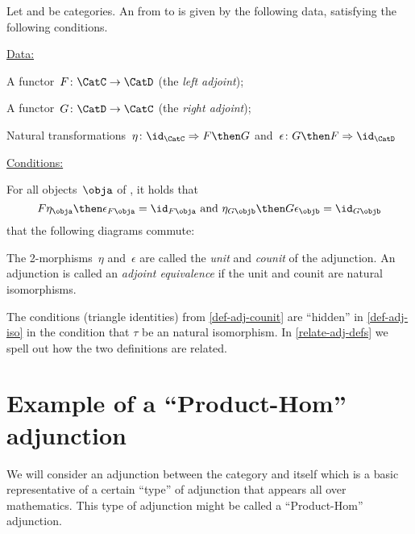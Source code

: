 \begin{ctdefinition}\label{def-adj-counit}
  \label{def:cat-adjunction}
 Let \CatC and \CatD be categories. An \emph{} from \CatC to \CatD is given by the following data, satisfying the following conditions.

  \underline{Data:}
  \begin{compactenum}
    \item A functor~$F\colon \CatC \to \CatD$ (the \emph{left adjoint});
    \item A functor~$G\colon \CatD \to \CatC$ (the \emph{right adjoint});
    \item Natural transformations~$\eta \colon \id_\CatC \Rightarrow F \then G$ and~$\epsilon \colon G \then F \Rightarrow \id_\CatD$
  \end{compactenum}

  \underline{Conditions:}
  \begin{compactenum}
    \item For all objects~$\obja$ of \CatC, it holds that
    \begin{equation*}
      F\eta_\obja \then \epsilon_{F\obja} = \id_{F\obja} \text{ and }  \eta_{G\objb} \then G\epsilon_\objb = \id_{G\objb}
    \end{equation*}
     that the following diagrams commute:

\begin{center}
\end{center}
  \end{compactenum}
  
  The 2-morphisms~$\eta$ and~$\epsilon$ are called the \emph{unit} and \emph{counit} of the adjunction.
  An adjunction is called an \emph{adjoint equivalence} if the unit and counit are natural isomorphisms.
\end{ctdefinition}

\begin{remark}
The conditions (triangle identities) from \cref{def-adj-counit} are ``hidden'' in \cref{def-adj-iso} in the condition that $\tau$ be an natural isomorphism. In \cref{relate-adj-defs} we spell out how the two definitions are related. 
\end{remark}

\section{Example of a ``Product-Hom'' adjunction}
We will consider an adjunction between the category \Set and itself which is a basic representative of a certain ``type'' of adjunction that appears all over mathematics. This type of adjunction might be called a ``Product-Hom'' adjunction. 


